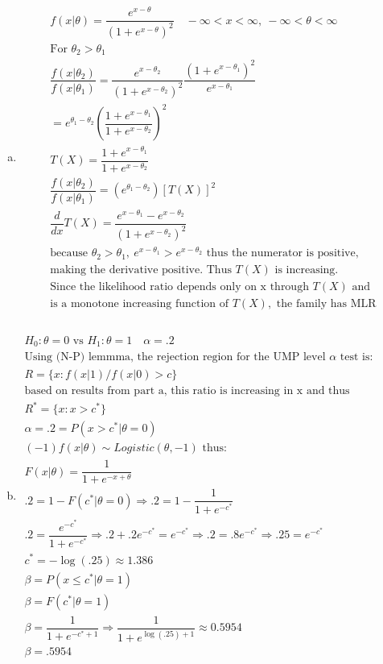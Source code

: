 \documentclass{article}
\newcommand{\B}{\beta}
\newcommand{\ta}{\theta}
\begin{document}
\begin{flushleft}
\begin{enumerate}[(a)]
	\item 
\begin{multline*}\\
f(x|\ta)=\dfrac{e^{x-\ta}}{(1+e^{x-\ta})^2} \quad -\infty <x<\infty, \ -\infty <\ta<\infty\\
\text{For } \ta_2>\ta_1\\
\dfrac{f(x|\ta_2)}{f(x|\ta_1)}=\dfrac{e^{x-\ta_2}}{(1+e^{x-\ta_2})^2}\dfrac{(1+e^{x-\ta_1})^2}{e^{x-\ta_1}}\\
=e^{\ta_1-\ta_2}\left(\dfrac{1+e^{x-\ta_1}}{1+e^{x-\ta_2}}\right)^2\\
T(X)=\dfrac{1+e^{x-\ta_1}}{1+e^{x-\ta_2}}\\
\dfrac{f(x|\ta_2)}{f(x|\ta_1)}=(e^{\ta_1-\ta_2})[T(X)]^2\\
\dfrac{d}{dx}T(X)=\dfrac{e^{x-\ta_1}-e^{x-\ta_2}}{(1+e^{x-\ta_2})^2}\\
\text{because } \ta_2>\ta_1, \ e^{x-\ta_1}>e^{x-\ta_2} \text{ thus the numerator is positive,}\\
\text{making the derivative positive. Thus } T(X) \text{ is increasing.}\\
\text{Since the likelihood ratio depends only on x through } T(X) \text{ and}\\
\text{is a monotone increasing function of } T(X), \text{ the family has MLR}\\ 
\end{multline*}
	
	\item 
\begin{multline*}\\
H_0: \ta=0 \text{ vs } H_1: \ta=1 \quad \alpha=.2\\
\text{Using (N-P) lemmma, the rejection region for the UMP level } \alpha \text{ test is:}\\
R=\{x:f(x|1)/f(x|0)>c \}\\
\text{based on results from part a, this ratio is increasing in x and thus equivalent to:}\\
R^*=\{x:x>c^* \}\\
\alpha=.2=P(x> c^*|\ta=0)\\
(-1)f(x|\ta)\sim Logistic(\ta,-1) \text{ thus:}\\
F(x|\ta)=\dfrac{1}{1+e^{-x+\ta}}\\
.2=1-F(c^*|\ta=0)\Rightarrow.2=1-\dfrac{1}{1+e^{-c^*}}\\
.2=\dfrac{e^{-c^*}}{1+e^{-c^*}}\Rightarrow
.2+.2e^{-c^*}=e^{-c^*}\Rightarrow.2=.8e^{-c^*}\Rightarrow.25=e^{-c^*}\\
c^*=-\log(.25)\approx 1.386\\
\B=P(x\leq c^*|\ta=1)\\
\B=F(c^*|\ta=1)\\
\B=\dfrac{1}{1+e^{-c^*+1}}\Rightarrow \dfrac{1}{1+e^{\log(.25)+1}}\approx 0.5954\\
\B=.5954\\
\end{multline*}


\end{enumerate}
\end{flushleft}
\end{document}
